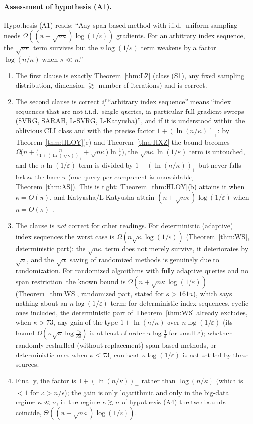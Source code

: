 \paragraph{Assessment of hypothesis (A1).}
Hypothesis (A1) reads: ``Any span-based method with i.i.d.\ uniform sampling needs $\Omega((n+\sqrt{n\kappa})\log(1/\varepsilon))$ gradients. For an arbitrary index sequence, the $\sqrt{n\kappa}$ term survives but the $n\log(1/\varepsilon)$ term weakens by a factor $\log(n/\kappa)$ when $\kappa\ll n$.''
\begin{enumerate}[nosep,label=(\roman*)]
\item The first clause is exactly Theorem~\ref{thm:LZ} (class (S1), any fixed sampling distribution, dimension $\gtrsim$ number of iterations) and is correct.
\item The second clause is correct \emph{if} ``arbitrary index sequence'' means ``index sequences that are not i.i.d.\ single queries, in particular full-gradient sweeps (SVRG, SARAH, L-SVRG, L-Katyusha)'', and if it is understood within the oblivious CLI class and with the precise factor $1+(\ln(n/\kappa))_+$: by Theorem~\ref{thm:HLOY}(c) and Theorem~\ref{thm:HXZ} the bound becomes $\Omega\big(n+\big(\frac{n}{1+(\ln(n/\kappa))_+}+\sqrt{n\kappa}\big)\ln\frac1\varepsilon\big)$, the $\sqrt{n\kappa}\ln(1/\varepsilon)$ term is untouched, and the $n\ln(1/\varepsilon)$ term is divided by $1+(\ln(n/\kappa))_+$ but never falls below the bare $n$ (one query per component is unavoidable, Theorem~\ref{thm:AS}). This is tight: Theorem~\ref{thm:HLOY}(b) attains it when $\kappa=O(n)$, and Katyusha/L-Katyusha attain $(n+\sqrt{n\kappa})\log(1/\varepsilon)$ when $n=O(\kappa)$ \cite{allenzhu2018katyusha,kovalev2020dont}.
\item The clause is \emph{not} correct for other readings. For deterministic (adaptive) index sequences the worst case is $\Omega(n\sqrt\kappa\log(1/\varepsilon))$ (Theorem~\ref{thm:WS}, deterministic part): the $\sqrt{n\kappa}$ term does not merely survive, it deteriorates by $\sqrt n$, and the $\sqrt n$ saving of randomized methods is genuinely due to randomization. For randomized algorithms with fully adaptive queries and no span restriction, the known bound is $\Omega(n+\sqrt{n\kappa}\log(1/\varepsilon))$ (Theorem~\ref{thm:WS}, randomized part, stated for $\kappa>161n$), which says nothing about an $n\log(1/\varepsilon)$ term; for deterministic index sequences, cyclic ones included, the deterministic part of Theorem~\ref{thm:WS} already excludes, when $\kappa>73$, any gain of the type $1+\ln(n/\kappa)$ over $n\log(1/\varepsilon)$ (its bound $\Omega(n\sqrt\kappa\log\frac{\varepsilon_0}{\kappa\varepsilon})$ is at least of order $n\log\frac1\varepsilon$ for small $\varepsilon$); whether randomly reshuffled (without-replacement) span-based methods, or deterministic ones when $\kappa\le73$, can beat $n\log(1/\varepsilon)$ is not settled by these sources.
\item Finally, the factor is $1+(\ln(n/\kappa))_+$ rather than $\log(n/\kappa)$ (which is $<1$ for $\kappa>n/e$); the gain is only logarithmic and only in the big-data regime $\kappa\ll n$; in the regime $\kappa\gtrsim n$ of hypothesis (A4) the two bounds coincide, $\Theta((n+\sqrt{n\kappa})\log(1/\varepsilon))$.
\end{enumerate}
